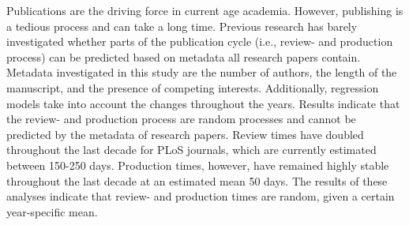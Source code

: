 
Publications are the driving force in current age academia. However, publishing is a tedious process and can take a long time. Previous research has barely investigated whether parts of the publication cycle (i.e., review- and production process) can be predicted based on metadata all research papers contain. Metadata investigated in this study are the number of authors, the length of the manuscript, and the presence of competing interests. Additionally, regression models take into account the changes throughout the years. Results indicate that the review- and production process are random processes and cannot be predicted by the metadata of research papers. Review times have doubled throughout the last decade for PLoS journals, which are currently estimated between 150-250 days. Production times, however, have remained highly stable throughout the last decade at an estimated mean 50 days. The results of these analyses indicate that review- and production times are random, given a certain year-specific mean. 
  
  